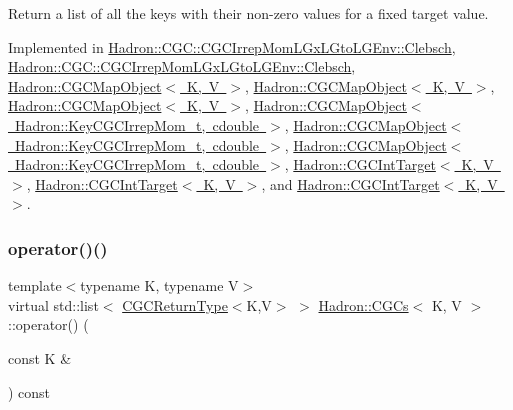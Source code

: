 Return a list of all the keys with their non-\/zero values for a fixed target value. 



Implemented in \mbox{\hyperlink{classHadron_1_1CGC_1_1CGCIrrepMomLGxLGtoLGEnv_1_1Clebsch_a8a003db7855154fba35df2485da43353}{Hadron\+::\+C\+G\+C\+::\+C\+G\+C\+Irrep\+Mom\+L\+Gx\+L\+Gto\+L\+G\+Env\+::\+Clebsch}}, \mbox{\hyperlink{classHadron_1_1CGC_1_1CGCIrrepMomLGxLGtoLGEnv_1_1Clebsch_a8a003db7855154fba35df2485da43353}{Hadron\+::\+C\+G\+C\+::\+C\+G\+C\+Irrep\+Mom\+L\+Gx\+L\+Gto\+L\+G\+Env\+::\+Clebsch}}, \mbox{\hyperlink{classHadron_1_1CGCMapObject_aeb342dc81f17743a25b969f540db4edf}{Hadron\+::\+C\+G\+C\+Map\+Object$<$ K, V $>$}}, \mbox{\hyperlink{classHadron_1_1CGCMapObject_aeb342dc81f17743a25b969f540db4edf}{Hadron\+::\+C\+G\+C\+Map\+Object$<$ K, V $>$}}, \mbox{\hyperlink{classHadron_1_1CGCMapObject_aeb342dc81f17743a25b969f540db4edf}{Hadron\+::\+C\+G\+C\+Map\+Object$<$ K, V $>$}}, \mbox{\hyperlink{classHadron_1_1CGCMapObject_aeb342dc81f17743a25b969f540db4edf}{Hadron\+::\+C\+G\+C\+Map\+Object$<$ Hadron\+::\+Key\+C\+G\+C\+Irrep\+Mom\+\_\+t, cdouble $>$}}, \mbox{\hyperlink{classHadron_1_1CGCMapObject_aeb342dc81f17743a25b969f540db4edf}{Hadron\+::\+C\+G\+C\+Map\+Object$<$ Hadron\+::\+Key\+C\+G\+C\+Irrep\+Mom\+\_\+t, cdouble $>$}}, \mbox{\hyperlink{classHadron_1_1CGCMapObject_aeb342dc81f17743a25b969f540db4edf}{Hadron\+::\+C\+G\+C\+Map\+Object$<$ Hadron\+::\+Key\+C\+G\+C\+Irrep\+Mom\+\_\+t, cdouble $>$}}, \mbox{\hyperlink{classHadron_1_1CGCIntTarget_a5946627ddb796961b97b7e0c57e32d83}{Hadron\+::\+C\+G\+C\+Int\+Target$<$ K, V $>$}}, \mbox{\hyperlink{classHadron_1_1CGCIntTarget_a5946627ddb796961b97b7e0c57e32d83}{Hadron\+::\+C\+G\+C\+Int\+Target$<$ K, V $>$}}, and \mbox{\hyperlink{classHadron_1_1CGCIntTarget_a5946627ddb796961b97b7e0c57e32d83}{Hadron\+::\+C\+G\+C\+Int\+Target$<$ K, V $>$}}.

\mbox{\label{classHadron_1_1CGCs_a8d2d80be37b603359708ebdd5923ff47}} 
\subsubsection{\texorpdfstring{operator()()}{operator()()}\hspace{0.1cm}{\footnotesize\ttfamily [6/6]}}
{\footnotesize\ttfamily template$<$typename K, typename V$>$ \\
virtual std\+::list$<$ \mbox{\hyperlink{structHadron_1_1CGCReturnType}{C\+G\+C\+Return\+Type}}$<$K,V$>$ $>$ \mbox{\hyperlink{classHadron_1_1CGCs}{Hadron\+::\+C\+G\+Cs}}$<$ K, V $>$\+::operator() (\begin{DoxyParamCaption}\item[{const K \&}]{ }\end{DoxyParamCaption}) const\hspace{0.3cm}{\ttfamily [pure virtual]}}



